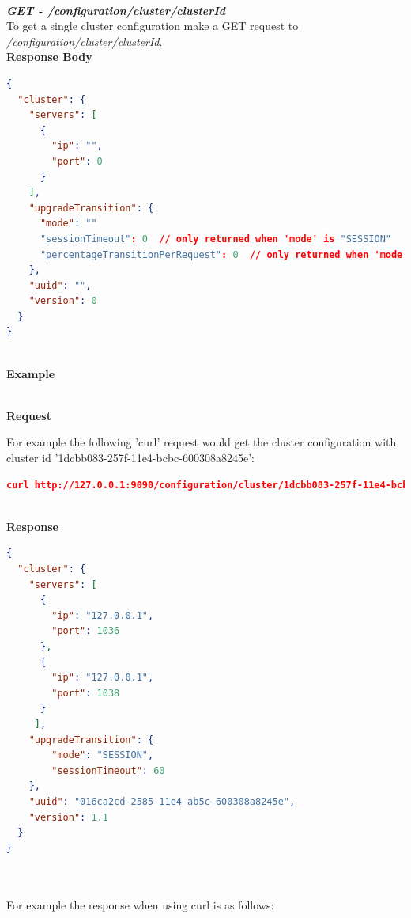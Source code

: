 \documentclass[a4paper,11pt,twoside]{article}
\begin{document}
\noindent \\
\textit{\textbf{GET - /configuration/cluster/{clusterId}}}\\

\noindent 
To get a single cluster configuration make a GET request to \textit{/configuration/cluster/{clusterId}}.\\ 

\noindent 
\textbf{Response Body}\\

\begin{lstlisting}[language=json,firstnumber=1]
{
  "cluster": {
    "servers": [
      {
        "ip": "",
        "port": 0
      }
    ],
    "upgradeTransition": {
      "mode": ""
      "sessionTimeout": 0  // only returned when 'mode' is "SESSION" 
      "percentageTransitionPerRequest": 0  // only returned when 'mode' is "GRADUAL"
    },
    "uuid": "",
    "version": 0
  }
} 
\end{lstlisting}

\noindent \\
\textbf{Example}

\noindent \\
\textbf{Request}

\noindent 
For example the following 'curl' request would get the cluster configuration with cluster id '1dcbb083-257f-11e4-bcbc-600308a8245e':\\

\begin{lstlisting}[language=json,firstnumber=1]
curl http://127.0.0.1:9090/configuration/cluster/1dcbb083-257f-11e4-bcbc-600308a8245e -X GET
\end{lstlisting}

\noindent \\
\textbf{Response}\\

\begin{lstlisting}[language=json,firstnumber=1]
{
  "cluster": {
    "servers": [
      {
        "ip": "127.0.0.1",
        "port": 1036
      },
      {
        "ip": "127.0.0.1",
        "port": 1038
      }
     ],
    "upgradeTransition": {
        "mode": "SESSION",
        "sessionTimeout": 60
    },
    "uuid": "016ca2cd-2585-11e4-ab5c-600308a8245e",
    "version": 1.1
  }
}
  
\end{lstlisting}

\noindent \\
For example the response when using curl is as follows:
\end{document}

